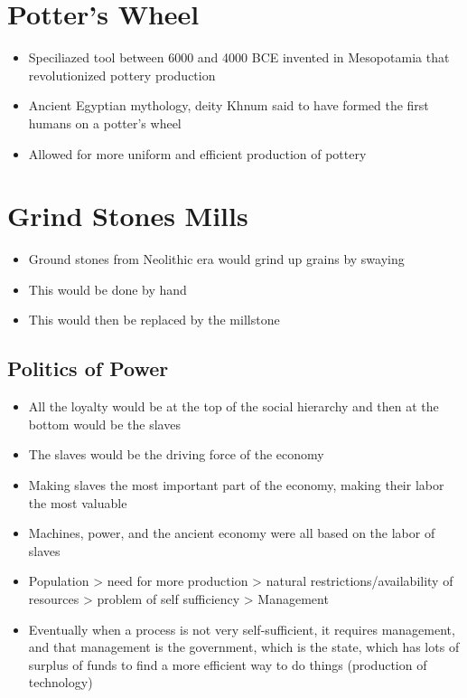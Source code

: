 \documentclass{article}
\begin{document}
\section*{Potter's Wheel}
\begin{itemize}
  \item Speciliazed tool between 6000 and 4000 BCE
    invented in Mesopotamia that revolutionized pottery production
  \item Ancient Egyptian mythology, deity Khnum said to have
    formed the first humans on a potter's wheel
  \item Allowed for more uniform and efficient production of pottery
\end{itemize}

\section*{Grind Stones \rightarrow{} Mills}
\begin{itemize}
  \item Ground stones from Neolithic era would grind up grains by swaying
  \item This would be done by hand
  \item This would then be replaced by the millstone
\end{itemize}

\subsection{Politics of Power}
\begin{itemize}
  \item All the loyalty would be at the top of the
    social hierarchy and then at the bottom would be the slaves
  \item The slaves would be the driving force of the economy
  \item Making slaves the most important part of the economy,
    making their labor the most valuable
  \item Machines, power, and the ancient economy were all
    based on the labor of slaves
  \item Population > need for more production
    > natural restrictions/availability of resources > problem of self
    sufficiency > Management
  \item Eventually when a process is not very self-sufficient,
    it requires management, and that management is the
    government, which is the state, which has lots of surplus
    of funds to find a more efficient way to do things (production of technology)
\end{itemize}
\end{document}
